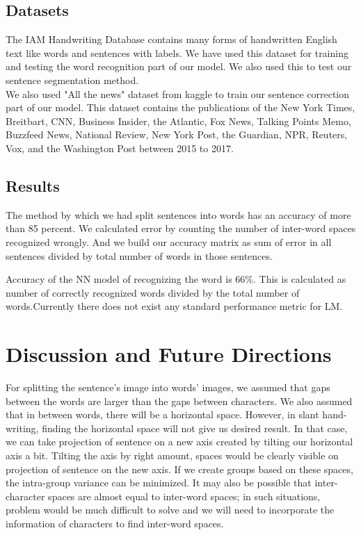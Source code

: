 \documentclass[a4paper, 10pt,twocolumn]{article}
\begin{document}
\subsection*{Datasets}
The IAM Handwriting Database contains many forms of handwritten English text like words and sentences with labels. We have used this dataset for training and testing the word recognition part of our model. We also used this to test our sentence segmentation method.
\\
We also used "All the news" dataset from kaggle to train our sentence correction part of our model. This dataset contains the publications of the New York Times, Breitbart, CNN, Business Insider, the Atlantic, Fox News, Talking Points Memo, Buzzfeed News, National Review, New York Post, the Guardian, NPR, Reuters, Vox, and the Washington Post between 2015 to 2017.
\subsection*{Results}
The method by which we had split sentences into words has an accuracy of more than 85 percent. We calculated error by counting the number of inter-word spaces recognized wrongly. And we build our accuracy matrix as sum of error in all sentences divided by total number of words in those sentences.

Accuracy of the NN model of recognizing the word is 66\%. This is calculated as number of correctly recognized words divided by the total number of words.\newline Currently there does not exist any standard performance metric for LM.

\section{Discussion and Future Directions}
For splitting the sentence's image into words' images, we assumed that gaps between the words are larger than the gaps between characters. We also assumed that in between words, there will be a horizontal space. However, in slant hand-writing, finding the horizontal space will not give us desired result. In that case, we can take projection of sentence on a new axis created by tilting our horizontal axis a bit. Tilting the axis by right amount, spaces would be clearly visible on projection of sentence on the new axis. If we create groups based on these spaces, the intra-group variance can be minimized. It may also be possible that inter-character spaces are almost equal to inter-word spaces; in such situations, problem would be much difficult to solve and we will need to incorporate the information of characters to find inter-word spaces.\newline
\end{document}
